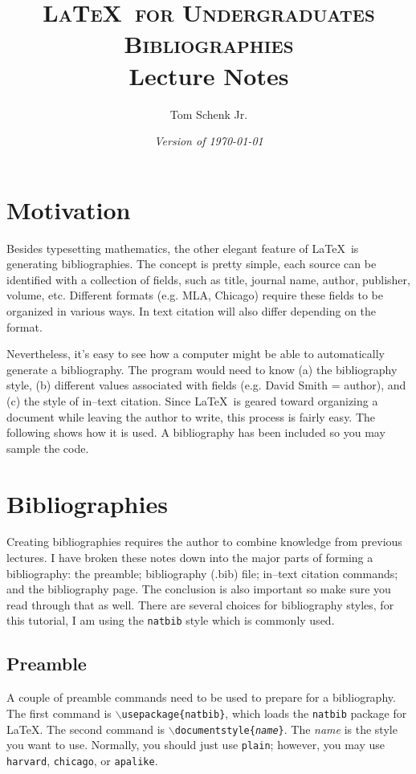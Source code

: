 \documentclass{article}
\title{\textsc{\LaTeX\ for Undergraduates\\
			Bibliographies} \\
			Lecture Notes}
\author{Tom Schenk Jr.}		%
\date{\textit{Version of \today}}
\begin{document}
\maketitle

\section{Motivation}

Besides typesetting mathematics, the other elegant feature of \LaTeX\ is generating bibliographies. The concept is pretty simple, each source can be identified with a collection of fields, such as title, journal name, author, publisher, volume, etc. Different formats (e.g. MLA, Chicago) require these fields to be organized in various ways. In text citation will also differ depending on the format.

Nevertheless, it's easy to see how a computer might be able to automatically generate a bibliography. The program would need to know (a) the bibliography style, (b) different values associated with fields (e.g. David Smith = author), and (c) the style of in--text citation. Since \LaTeX\ is geared toward organizing a document while leaving the author to write, this process is fairly easy. The following shows how it is used. A bibliography has been included so you may sample the code.


\section{Bibliographies}

Creating bibliographies requires the author to combine knowledge from previous lectures. I have broken these notes down into the major parts of forming a bibliography: the preamble; bibliography (.bib) file; in--text citation commands; and the bibliography page. The conclusion is also important so make sure you read through that as well. There are several choices for bibliography styles, for this tutorial, I am using the \texttt{natbib} style which is commonly used.

\subsection{Preamble}

A couple of preamble commands need to be used to prepare for a bibliography. The first command is \texttt{$\backslash$usepackage\{natbib\}}, which loads the \texttt{natbib} package for \LaTeX. The second command is \texttt{$\backslash$documentstyle\{\textit{name}\}}. The \textit{name} is the style you want to use. Normally, you should just use \texttt{plain}; however, you may use \texttt{harvard}, \texttt{chicago}, or \texttt{apalike}.
\end{document}
